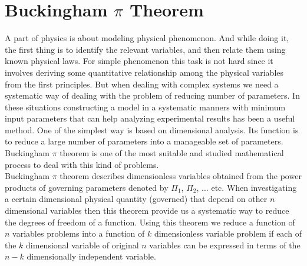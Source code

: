 \section{Buckingham $\pi$ Theorem}
A part of physics is about modeling physical phenomenon. And while doing it, the first thing is to identify the relevant variables, and then relate them using known physical laws. For simple phenomenon this task is not hard since it involves deriving some quantitative relationship among the physical variables from the first principles. But when dealing with complex systems we need a systematic way of dealing with the problem of reducing number of parameters. In these situations constructing a model in a systematic manners with minimum input parameters that can help analyzing experimental results has been a useful method. One of the simplest way is based on dimensional analysis. Its function is to reduce a large number of parameters into a manageable set of parameters. Buckingham $\pi$ theorem is one of the most suitable and studied mathematical process to deal with this kind of problems.\\

Buckingham $\pi$ theorem describes dimensionless variables obtained from the power products of governing parameters denoted by $\Pi_1$, $\Pi_2$, $\ldots$ etc. When investigating a certain dimensional physical quantity (governed) that depend on other $n$ dimensional variables then this theorem provide us a systematic way to reduce the degrees of freedom of a function. Using this theorem we reduce a function of $n$ variables problems into a function of $k$ dimensionless variable problem if each of the $k$ dimensional variable of original $n$ variables can be expressed in terms of the $n-k$ dimensionally independent variable. \\


